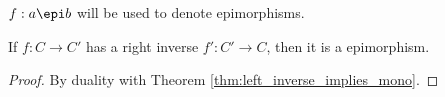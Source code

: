 \begin{remark}
  $f:a\epi b$ will be used to denote epimorphisms.
\end{remark}

\begin{theorem}\label{thm:right_inverse_implies_epi}
  If $f:C\to C'$ has a right inverse $f':C'\to C$, then it is a epimorphism.

  \begin{proof}
    By duality with Theorem \ref{thm:left_inverse_implies_mono}.
  \end{proof}
\end{theorem}